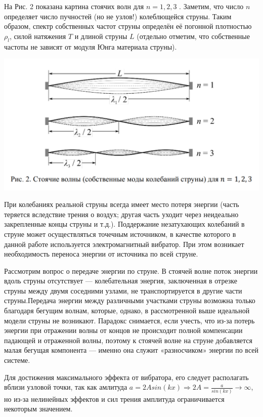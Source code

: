 \documentclass[a4paper, 12pt]{article} %
\begin{document}
На Рис. 2 показана картина стоячих волн для $n = 1, 2, 3$ . Заметим, что
число $n$ определяет число пучностей (но не узлов!) колеблющейся струны.
Таким образом, спектр собственных частот струны определён её погонной
плотностью $\rho_l$, силой натяжения $T$ и длиной струны $L$ (отдельно отметим, что
собственные частоты не зависят от модуля Юнга материала струны).

\includegraphics[width=\textwidth]{1.4.5 3}

При колебаниях реальной струны всегда имеет место потеря энергии
(часть теряется вследствие трения о воздух; другая часть уходит через неидеально закрепленные концы струны и т.д.). Поддержание незатухающих колебаний в струне может осуществляться точечным источником, в качестве которого в данной работе используется электромагнитный вибратор. При этом
возникает необходимость переноса энергии от источника по всей струне.

Рассмотрим вопрос о передаче энергии по струне. В стоячей волне поток
энергии вдоль струны отсутствует — колебательная энергия, заключенная
в отрезке струны между двумя соседними узлами, не транспортируется в другие части струны.Передача энергии между различными участками струны возможна
только благодаря бегущим волнам, которые, однако, в рассмотренной выше
идеальной модели струны не возникают. Парадокс снимается, если учесть,
что из-за потерь энергии при отражении волны от концов не происходит полной компенсации падающей и отраженной волны, поэтому к стоячей волне
на струне добавляется малая бегущая компонента — именно она служит «разносчиком» энергии по всей системе.

Для достижения максимального эффекта от вибратора, его следует располагать вблизи узловой точки, так как амлитуда $a = 2A sin(kx) \Rightarrow 2A = \frac{a}{sin(kx)}\rightarrow \infty$, но из-за нелинейных эффектов и сил трения амплитуда ограничивается некоторым значением.\\
\end{document}

